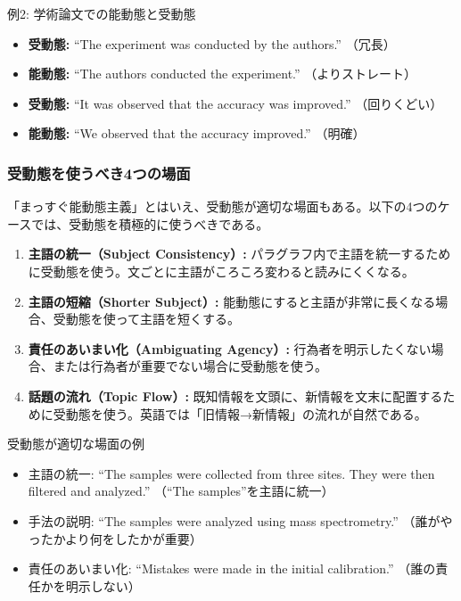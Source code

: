 \begin{itembox}[l]{例2: 学術論文での能動態と受動態}
\begin{itemize}
\item \textbf{受動態:} ``The experiment was conducted by the authors.'' （冗長）
\item \textbf{能動態:} ``The authors conducted the experiment.'' （よりストレート）
\item \textbf{受動態:} ``It was observed that the accuracy was improved.'' （回りくどい）
\item \textbf{能動態:} ``We observed that the accuracy improved.'' （明確）
\end{itemize}
\end{itembox}

\subsubsection{受動態を使うべき4つの場面}

「まっすぐ能動態主義」とはいえ、受動態が適切な場面もある。以下の4つのケースでは、受動態を積極的に使うべきである。

\begin{enumerate}
\item \textbf{主語の統一（Subject Consistency）:} パラグラフ内で主語を統一するために受動態を使う。文ごとに主語がころころ変わると読みにくくなる。
\item \textbf{主語の短縮（Shorter Subject）:} 能動態にすると主語が非常に長くなる場合、受動態を使って主語を短くする。
\item \textbf{責任のあいまい化（Ambiguating Agency）:} 行為者を明示したくない場合、または行為者が重要でない場合に受動態を使う。
\item \textbf{話題の流れ（Topic Flow）:} 既知情報を文頭に、新情報を文末に配置するために受動態を使う。英語では「旧情報→新情報」の流れが自然である。
\end{enumerate}

\begin{itembox}[l]{受動態が適切な場面の例}
\begin{itemize}
\item 主語の統一: ``The samples were collected from three sites. They were then filtered and analyzed.'' （``The samples''を主語に統一）
\item 手法の説明: ``The samples were analyzed using mass spectrometry.'' （誰がやったかより何をしたかが重要）
\item 責任のあいまい化: ``Mistakes were made in the initial calibration.'' （誰の責任かを明示しない）
\end{itemize}
\end{itembox}

